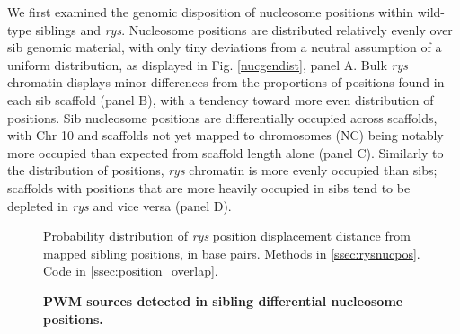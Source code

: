 \documentclass{ut-thesis}
\begin{document}
\begin{NoHyper}
 We first examined the genomic disposition of nucleosome positions within wild-type siblings and \textit{rys}. Nucleosome positions are distributed relatively evenly over sib genomic material, with only tiny deviations from a neutral assumption of a uniform distribution, as displayed in Fig. \ref{nucgendist}, panel A. Bulk \textit{rys} chromatin displays minor differences from the proportions of positions found in each sib scaffold (panel B), with a tendency toward more even distribution of positions. Sib nucleosome positions are differentially occupied across scaffolds, with Chr 10 and scaffolds not yet mapped to chromosomes (NC) being notably more occupied than expected from scaffold length alone (panel C). Similarly to the distribution of positions, \textit{rys} chromatin is more evenly occupied than sibs; scaffolds with positions that are more heavily occupied in sibs tend to be depleted in \textit{rys} and vice versa (panel D). 


\begin{figure}[!h]
    \caption{{\bf PWM sources detected in sibling differential nucleosome positions.}}
    Probability distribution of \textit{rys} position displacement distance from mapped sibling positions, in base pairs. 
    \label{shiftdist}
    Methods in \autoref{ssec:rysnucpos}.
    Code in \autoref{ssec:position_overlap}.
\end{figure}


\end{NoHyper}
\end{document}
